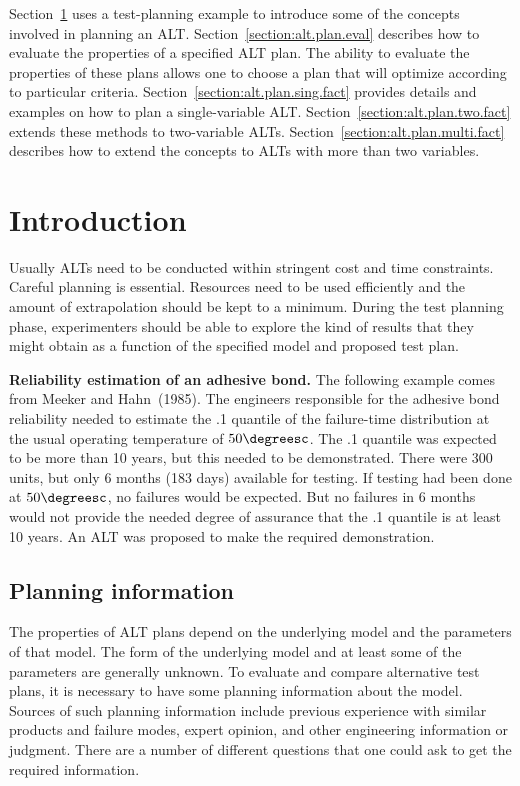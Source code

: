 Section~\ref{section:alt.plan.intro} uses a test-planning example to
introduce some of the concepts involved in planning an ALT.
Section~\ref{section:alt.plan.eval} describes how to evaluate the
properties of a specified ALT plan. The ability to evaluate the
properties of these plans allows one to choose a plan that will
optimize according to particular criteria.
Section~\ref{section:alt.plan.sing.fact} provides details and
examples on how to plan a single-variable ALT.
Section~\ref{section:alt.plan.two.fact} extends these methods to
two-variable ALTs.  Section~\ref{section:alt.plan.multi.fact}
describes how to extend the concepts to ALTs with more than two
variables.

\section{Introduction}
\label{section:alt.plan.intro}
Usually ALTs need to be conducted within stringent
cost and time constraints.  Careful planning is essential.  Resources
need to be used efficiently and the amount of extrapolation should be
kept to a minimum. During the test planning phase,
experimenters should be able to explore the kind of results that they
might obtain as a function of the specified model and proposed test plan.

\begin{example}
\label{example:adv.bond.intro}
{\bf Reliability estimation of an adhesive bond.} The following
example comes from Meeker and Hahn~(1985). The engineers responsible
for the adhesive bond reliability needed to estimate the .1 quantile
of the failure-time distribution at the usual operating temperature
of $50\degreesc$.  The .1 quantile was expected to be more than 10
years, but this needed to be demonstrated.  There were 300 units,
but only 6 months (183 days) available for testing.  If testing had been done
at $50\degreesc$, no failures would be expected.  But no failures in
6 months would not provide the needed degree of assurance that the
.1 quantile is at least 10 years.  An ALT was proposed to make the
required demonstration.
\end{example}

\subsection{Planning information}
The properties of ALT plans depend on the underlying model and the
parameters of that model.  The form of the underlying model and at
least some of the parameters are generally unknown. To evaluate and
compare alternative test plans, it is necessary to have some planning
information about the model. Sources of such planning
information include previous experience with similar products and
failure modes, expert opinion, and other engineering information or
judgment. There are a number of different questions that one could ask 
to get the required information.

